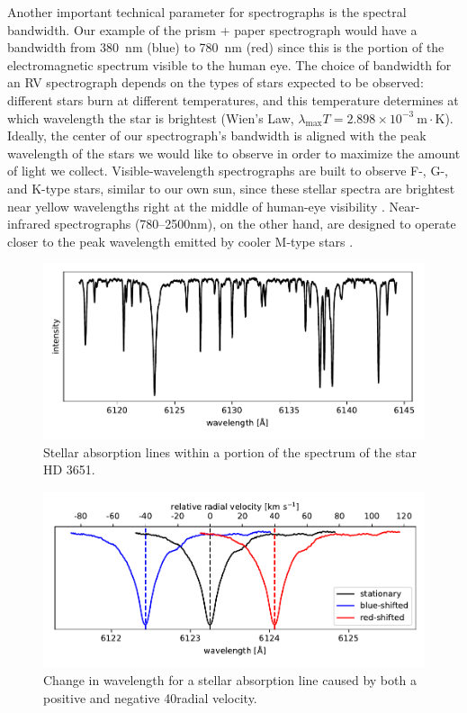 Another important technical parameter for spectrographs is the spectral bandwidth. Our example of the prism + paper spectrograph would have a bandwidth from 380~\si{\nano\meter} (blue) to 780~\si{\nano\meter} (red) since this is the portion of the electromagnetic spectrum visible to the human eye. The choice of bandwidth for an RV spectrograph depends on the types of stars expected to be observed: different stars burn at different temperatures, and this temperature determines at which wavelength the star is brightest (Wien's Law, $\lambda_{\mathrm{max}}T = 2.898\times10^{-3}~\mathrm{m\cdot K}$). Ideally, the center of our spectrograph's bandwidth is aligned with the peak wavelength of the stars we would like to observe in order to maximize the amount of light we collect. Visible-wavelength spectrographs are built to observe F-, G-, and K-type stars, similar to our own sun, since these stellar spectra are brightest near yellow wavelengths right at the middle of human-eye visibility \citep[e.g. HARPS;][]{pepe_harps_2002, mayor_setting_2003}. Near-infrared spectrographs (780--2500nm), on the other hand, are designed to operate closer to the peak wavelength emitted by cooler M-type stars \citep[e.g. HPF;][]{mahadevan_habitable-zone_2014}.

\begin{figure}
    \centering
    \includegraphics[width=\textwidth]{figures-1/star.pdf}
    \caption[Example of stellar absorption lines -- HD 3651]{Stellar absorption lines within a portion of the spectrum of the star HD 3651.}
    \label{fig:star}
\end{figure}

\begin{figure}
    \centering
    \includegraphics[width=\textwidth]{figures-1/absorption-lines.pdf}
    \caption[Doppler effect on a single stellar absorption line]{Change in wavelength for a stellar absorption line caused by both a positive and negative 40\kms radial velocity.}
    \label{fig:absorption-lines}
\end{figure}


